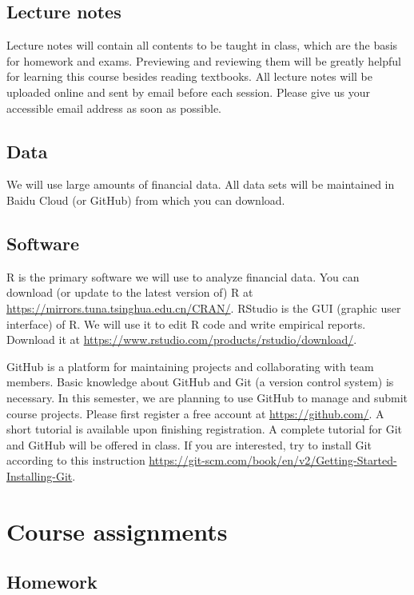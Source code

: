 \documentclass[11pt]{article}
\begin{document}
\subsection*{Lecture notes}
\label{sec:org0ba8e86}

Lecture notes will contain all contents to be taught in class, which
are the basis for homework and exams. Previewing and reviewing them
will be greatly helpful for learning this course besides reading
textbooks. All lecture notes will be uploaded online and sent by email before
each session. Please give us your accessible email address as soon as
possible.

\subsection*{Data}
\label{sec:org27119db}

We will use large amounts of financial data. All data sets will be
maintained in Baidu Cloud (or GitHub) from which you can download.

\subsection*{Software}
\label{sec:org6930c39}

R is the primary software we will use to analyze financial data. You
can download (or update to the latest version of) R at
\url{https://mirrors.tuna.tsinghua.edu.cn/CRAN/}. RStudio is the GUI
(graphic user interface) of R. We will use it to edit R code and write
empirical reports. Download it at
\url{https://www.rstudio.com/products/rstudio/download/}.

GitHub is a platform for maintaining projects and collaborating with
team members. Basic knowledge about GitHub and Git (a version control
system) is necessary. In this semester, we are planning to use GitHub
to manage and submit course projects. Please first register a free
account at \url{https://github.com/}. A short tutorial is available upon
finishing registration. A complete tutorial for Git and GitHub will be
offered in class. If you are interested, try to install Git according to
this instruction
\url{https://git-scm.com/book/en/v2/Getting-Started-Installing-Git}.


\section{Course assignments}
\label{sec:org2c64bf6}

\subsection*{Homework}
\label{sec:org5aebaa8}
\end{document}
